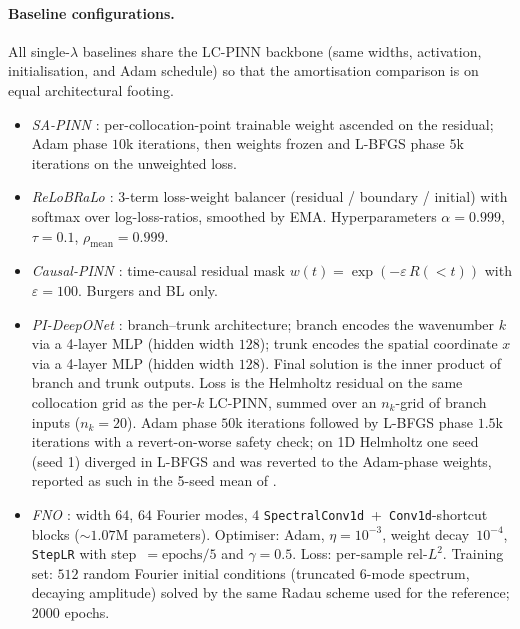 \documentclass{article}
\theoremstyle{plain}
\theoremstyle{definition}
\theoremstyle{remark}
\begin{document}
\paragraph{Baseline configurations.}
All single-$\lambda$ baselines share the LC-PINN backbone (same
widths, activation, initialisation, and Adam schedule) so that the
amortisation comparison is on equal architectural footing.

\begin{itemize}\setlength{\itemsep}{0pt}
\item \emph{SA-PINN \citep{mcclenny2020}}: per-collocation-point
      trainable weight ascended on the residual; Adam phase
      $10\text{k}$ iterations, then weights frozen and L-BFGS phase
      $5\text{k}$ iterations on the unweighted loss.
\item \emph{ReLoBRaLo \citep{bischof2021}}: 3-term loss-weight
      balancer (residual / boundary / initial) with softmax over
      log-loss-ratios, smoothed by EMA. Hyperparameters
      $\alpha\!=\!0.999$, $\tau\!=\!0.1$,
      $\rho_{\text{mean}}\!=\!0.999$.
\item \emph{Causal-PINN \citep{wang2024}}: time-causal residual mask
      $w(t)\!=\!\exp\!\left(-\varepsilon\,R(<\!t)\right)$ with
      $\varepsilon\!=\!100$. Burgers and BL only.
\item \emph{PI-DeepONet \citep{wang2021pi-deeponet}}: branch--trunk
      architecture; branch encodes the wavenumber $k$ via a 4-layer
      MLP (hidden width $128$); trunk encodes the spatial coordinate
      $x$ via a 4-layer MLP (hidden width $128$). Final solution is
      the inner product of branch and trunk outputs. Loss is the
      Helmholtz residual on the same collocation grid as the per-$k$
      LC-PINN, summed over an $n_k$-grid of branch inputs ($n_k\!=\!20$).
      Adam phase $50$k iterations followed by L-BFGS phase $1.5$k
      iterations with a revert-on-worse safety check; on 1D Helmholtz
      one seed (seed 1) diverged in L-BFGS and was reverted to the
      Adam-phase weights, reported as such in the 5-seed mean of
      .
\item \emph{FNO \citep{li2020fno}}: width $64$, $64$ Fourier modes,
      $4$ \texttt{SpectralConv1d}~+~\texttt{Conv1d}-shortcut blocks
      ($\sim\!1.07$M parameters). Optimiser: Adam,
      $\eta\!=\!10^{-3}$, weight decay~$10^{-4}$, \texttt{StepLR}
      with step~$=\!\text{epochs}/5$ and $\gamma\!=\!0.5$. Loss:
      per-sample rel-$L^2$. Training set: $512$ random Fourier
      initial conditions (truncated 6-mode spectrum, decaying
      amplitude) solved by the same Radau scheme used for the
      reference; $2000$ epochs.
\end{itemize}
\end{document}
